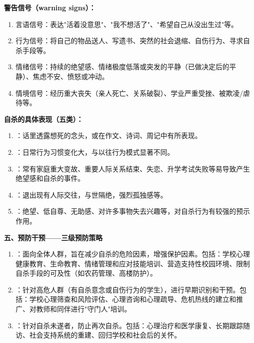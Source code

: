 \begin{keybox}
\textbf{警告信号（warning signs）：}
\begin{enumerate}[leftmargin=*]
    \item 言语信号：表达"活着没意思"、"我不想活了"、"希望自己从没出生过"等。
    \item 行为信号：将自己的物品送人、写遗书、突然的社会退缩、自伤行为、寻求自杀手段等。
    \item 情绪信号：持续的绝望感、情绪极度低落或突发的平静（已做决定后的平静）、焦虑不安、愤怒或冲动。
    \item 情境信号：经历重大丧失（亲人死亡、关系破裂）、学业严重受挫、被欺凌/虐待等。
\end{enumerate}

\textbf{自杀的具体表现（五类）：}
\begin{enumerate}[leftmargin=*]
    \item {}：话里透露想死的念头，或在作文、诗词、周记中有所表现。
    \item {}：日常行为习惯变化大，与以往行为模式显著不同。
    \item {}：常有家庭重大变故、重要人际关系结束、失恋、升学考试失败等易导致产生绝望感和自杀的事件。
    \item {}：退出现有人际交往，与世隔绝，强烈孤独感等。
    \item {}：绝望、低自尊、无助感、对许多事物失去兴趣等，对自杀行为有较强的预示作用。
\end{enumerate}

\textbf{五、预防干预——三级预防策略}
\begin{enumerate}[leftmargin=*]
    \item {}：面向全体人群，旨在减少自杀的危险因素，增强保护因素。包括：学校心理健康教育、生命教育、情绪管理和应对技能培训、营造支持性校园环境、限制自杀手段的可及性（如农药管理、高楼防护）。

    \item {}：针对高危人群（有自杀意念或自伤行为的学生），进行早期识别和干预。包括：学校心理筛查和风险评估、心理咨询和心理疏导、危机热线的建立和推广、对教师和同伴进行"守门人"培训。

    \item {}：针对自杀未遂者，防止再次自杀。包括：心理治疗和医学康复、长期跟踪随访、社会支持系统的重建、回归学校和社会后的关怀。
\end{enumerate}
\end{keybox}

